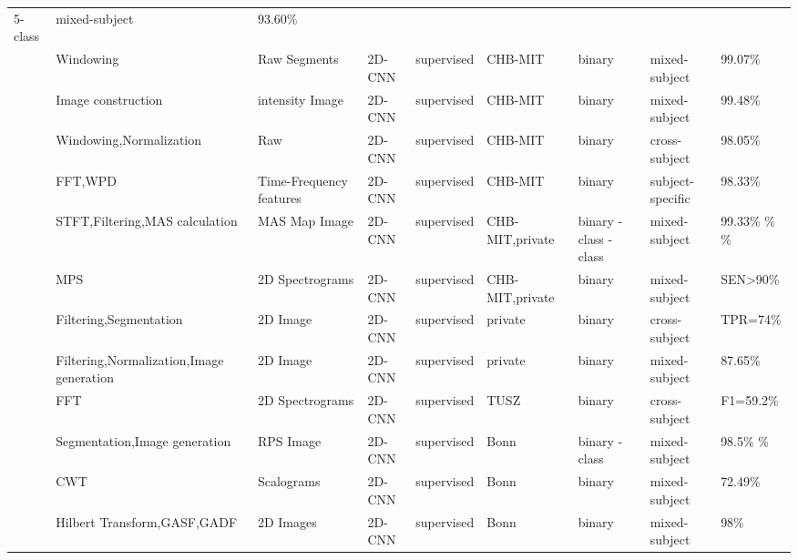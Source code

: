 \begin{table*}[h]
\begin{tabular}{p{0.4cm}p{2.8cm}p{2cm}p{1.5cm}p{1.9cm}p{1.9cm}p{0.8cm}p{1.8cm}p{1.5cm}}
5-class & mixed-subject & 93.60\% \\
~\cite{Seizure9} & Windowing & Raw Segments & 2D-CNN & supervised & CHB-MIT & binary & mixed-subject & 99.07\% \\
~\cite{Seizure10} & Image construction & intensity Image & 2D-CNN & supervised & CHB-MIT & binary & mixed-subject & 99.48\% \\
~\cite{hossain2019applying} & Windowing,Normalization & Raw & 2D-CNN & supervised & CHB-MIT & binary & cross-subject & 98.05\% \\
~\cite{Seizure12} & FFT,WPD & Time-Frequency  features & 2D-CNN & supervised & CHB-MIT & binary & subject-specific & 98.33\% \\
~\cite{Seizure13} & STFT,Filtering,\newline MAS calculation & MAS Map Image & 2D-CNN & supervised & CHB-MIT,\newline private & binary \newline
3-class \newline
5-class & mixed-subject & 99.33\% \newline
98.62\% \newline
87.95\% \\
~\cite{Seizure14} & MPS & 2D Spectrograms & 2D-CNN & supervised & CHB-MIT,\newline private & binary & mixed-subject & SEN\textgreater 90\% \\
~\cite{Seizure15} & Filtering,Segmentation & 2D Image & 2D-CNN & supervised & private & binary & cross-subject & TPR=74\% \\
~\cite{Seizure16} & Filtering,Normalization,\newline Image generation & 2D Image & 2D-CNN & supervised & private & binary & mixed-subject & 87.65\% \\
~\cite{Seizure17} & FFT & 2D Spectrograms & 2D-CNN & supervised & TUSZ & binary & cross-subject & F1=59.2\% \\
~\cite{Seizure18} & Segmentation,\newline Image generation & RPS Image & 2D-CNN & supervised & Bonn & binary \newline
3-class & mixed-subject & 98.5\% \newline
95\% \\
~\cite{Seizure19} & CWT & Scalograms & 2D-CNN & supervised & Bonn & binary & mixed-subject & 72.49\% \\
~\cite{Seizure20} & Hilbert Transform,\newline GASF,GADF & 2D Images & 2D-CNN & supervised & Bonn & binary & mixed-subject & 98\% \\

\end{tabular}
\end{table*}
